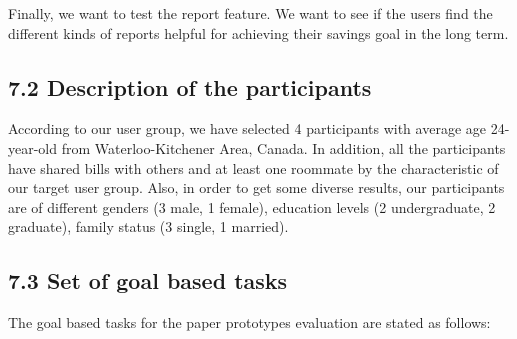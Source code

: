 \documentclass{sigchi}
\begin{document}
Finally, we want to test the report feature. We want to see if the users find the different kinds of reports helpful for achieving their savings goal in the long term. 


\subsection{7.2 Description of the participants}

According to our user group, we have selected 4 participants with average age 24-year-old from Waterloo-Kitchener Area, Canada. In addition, all the participants have shared bills with others and at least one roommate by the characteristic of our target user group. Also, in order to get some diverse results, our participants are of different genders (3 male, 1 female), education levels (2 undergraduate, 2 graduate), family status (3 single, 1 married).

\subsection{7.3 Set of goal based tasks}
The goal based tasks for the paper prototypes evaluation are stated as follows:
\end{document}
